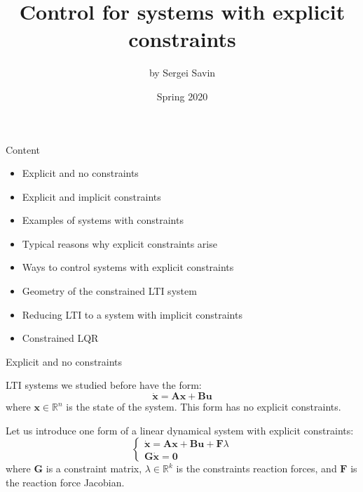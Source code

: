 \documentclass{beamer}
\title{ Control for systems with explicit constraints}
\author{by Sergei Savin}
\date{Spring 2020}
\begin{document}
\maketitle


\begin{frame}{Content}

\begin{itemize}
\item Explicit and no constraints
\item Explicit and implicit constraints
\item Examples of systems with constraints
\item Typical reasons why explicit constraints arise
\item Ways to control systems with explicit constraints
\item Geometry of the constrained LTI system
\item Reducing LTI to a system with implicit constraints
\item Constrained LQR
\end{itemize}

\end{frame}




\begin{frame}{Explicit and no constraints}
\begin{flushleft}

LTI systems we studied before have the form:
%
\[
\dot {\mathbf x} = \mathbf A \mathbf x + 
\mathbf B \mathbf u
\]
%
where $\mathbf x \in \mathbb{R}^n$ is the state of the system. This form has no explicit constraints.

\bigskip

Let us introduce one form of a linear dynamical system with explicit constraints:
%
\[
\begin{cases}
\dot {\mathbf x} = \mathbf A \mathbf x + 
\mathbf B \mathbf u + \mathbf F \lambda \\
\mathbf G \dot {\mathbf x} = \mathbf 0
\end{cases}
\]
%
where $\mathbf G$ is a constraint matrix, $\lambda \in \mathbb{R}^k$ is the constraints reaction forces, and $\mathbf F$ is the reaction force Jacobian.

\end{flushleft}
\end{frame}
\end{document}
